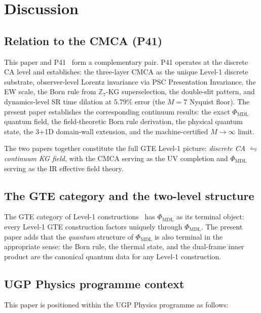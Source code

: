 \documentclass[11pt]{article}
\theoremstyle{remark}
\newcommand{\PHIMDL}{\Phi_{\mathrm{MDL}}}
\newcommand{\ZS}{\mathbb{Z}_7}
\begin{document}
\section{Discussion}
\label{sec:discussion}

\subsection{Relation to the CMCA (P41)}
\label{ssec:relation_p41}

This paper and P41~\cite{SpivackCMCA} form a complementary pair.
P41 operates at the discrete CA level and establishes: the three-layer CMCA
as the unique Level-1 discrete substrate, observer-level Lorentz invariance
via PSC Presentation Invariance, the EW scale, the Born rule from $\ZS$-KG
superselection, the double-slit pattern, and dynamics-level SR time dilation
at $5.79\%$ error (the $M=7$ Nyquist floor).  The present paper establishes
the corresponding continuum results: the exact $\PHIMDL$ quantum field, the
field-theoretic Born rule derivation, the physical quantum state, the 3+1D
domain-wall extension, and the machine-certified $M\to\infty$ limit.

The two papers together constitute the full GTE Level-1 picture:
\emph{discrete CA $\leftrightharpoons$ continuum KG field}, with the CMCA
serving as the UV completion and $\PHIMDL$ serving as the IR effective field
theory.

\subsection{The GTE category and the two-level structure}
\label{ssec:gte_category}

The GTE category of Level-1 constructions~\cite{SpivackCMCA,SpivackGTEMobius}
has $\PHIMDL$ as its terminal object: every Level-1 GTE construction factors
uniquely through $\PHIMDL$.  The present paper adds that the \emph{quantum}
structure of $\PHIMDL$ is also terminal in the appropriate sense: the
Born rule, the thermal state, and the dual-frame inner product are the
canonical quantum data for any Level-1 construction.

\subsection{UGP Physics programme context}
\label{ssec:gte_context}

This paper is positioned within the UGP Physics programme as follows:
\end{document}
